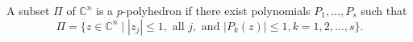 
A subset $\Pi$ of $\mathbb{C}^n$ is a $p$-polyhedron if there exist polynomials $P_1, \ldots, P_s$ such that
$$\Pi = \{z \in \mathbb{C}^n \mid |z_j| \leq 1, \text{ all } j, \text{ and } |P_k(z)| \leq 1, k = 1, 2, \ldots, s\}.$$
